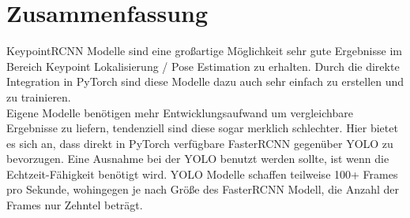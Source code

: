 \chapter{Zusammenfassung}
KeypointRCNN Modelle sind eine großartige Möglichkeit sehr gute Ergebnisse im Bereich Keypoint Lokalisierung / Pose Estimation zu erhalten.
Durch die direkte Integration in PyTorch sind diese Modelle dazu auch sehr einfach zu erstellen und zu trainieren.\\
Eigene Modelle benötigen mehr Entwicklungsaufwand um vergleichbare Ergebnisse zu liefern, tendenziell sind diese sogar merklich schlechter.
Hier bietet es sich an, dass direkt in PyTorch verfügbare FasterRCNN  gegenüber YOLO zu bevorzugen. 
Eine Ausnahme bei der YOLO benutzt werden sollte, ist wenn die Echtzeit-Fähigkeit benötigt wird.
YOLO Modelle schaffen teilweise 100+ Frames pro Sekunde, wohingegen je nach Größe des FasterRCNN Modell, die Anzahl der Frames nur Zehntel beträgt.

